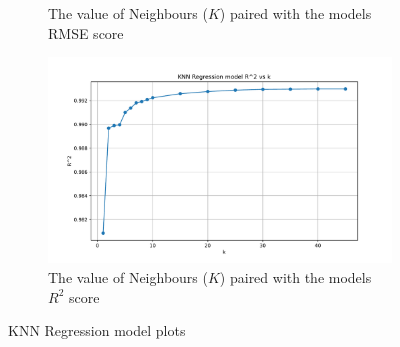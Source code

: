 \begin{figure}[!htbp]
\begin{subfigure}[b]{0.45\textwidth}
        \caption{The value of Neighbours ($K$) paired with the models RMSE score}
        \label{Fig: KNN K vs RMSE}
    \end{subfigure}
    \hfill
    \begin{subfigure}[b]{0.45\textwidth}
        \includegraphics[width=\textwidth]{../regression_model/plots/KNN_Regression/KNN Regression model R^2 vs k.pdf}
        \caption{The value of Neighbours ($K$) paired with the models $R^2$ score}
        \label{Fig: KNN K vs R^2}
    \end{subfigure}
    \caption{KNN Regression model plots}
\end{figure}
